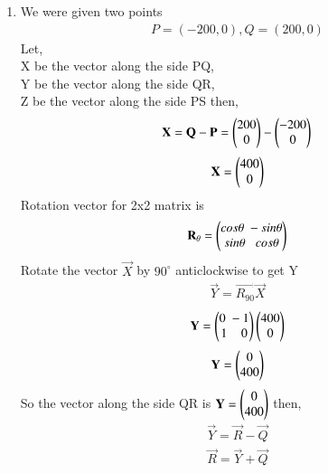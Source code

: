 \documentclass[journal]{IEEEtran}
\begin{document}
        \begin{enumerate}[label=(\alph*)]
            \item We were given two points 
            \begin{align}
                P=(-200,0),Q=(200,0)
            \end{align}
            Let,\\ X be the vector along the side PQ,\\ Y be the vector along the side QR,\\Z be the vector along the side PS then, \\
            \begin{align}
                \mathbf{X}=\mathbf{Q}-\mathbf{P}=\begin{pmatrix}200\\0\end{pmatrix}-\begin{pmatrix}-200\\0\end{pmatrix}
            \end{align}
            \begin{align}
                \mathbf{X}=\begin{pmatrix}400\\0\end{pmatrix}
            \end{align}
            Rotation vector for 2x2 matrix is 
            \begin{align}
                \mathbf{R_\theta}=\begin{pmatrix}cos \theta \; -sin \theta\\sin \theta\;\;\;cos \theta\end{pmatrix}
            \end{align}
            Rotate the vector $\vec{X}$ by $90^{\circ}$ anticlockwise to get Y
            \begin{align}
                \vec{Y}=\vec{R_{90}}\vec{X}
            \end{align}
            \begin{align}
                \mathbf{Y}=\begin{pmatrix}0\;-1\\1\;\;\;\;0\end{pmatrix}\begin{pmatrix}400\\0\end{pmatrix}
            \end{align}
            \begin{align}
                \mathbf{Y}=\begin{pmatrix}0\\400\end{pmatrix}
            \end{align}
            So the vector along the side QR is $\mathbf{Y}=\begin{pmatrix}0\\400\end{pmatrix}$ then,
            \begin{align}
                \vec{Y}=\vec{R}-\vec{Q}
            \end{align}
            \begin{align}
                \vec{R}=\vec{Y}+\vec{Q}
            \end{align}

\end{enumerate}
\end{document}
